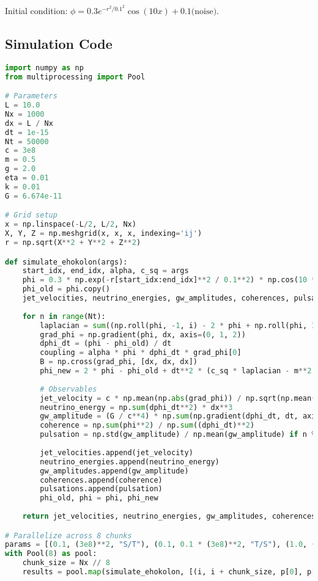 \documentclass[11pt]{article}
\begin{document}
Initial condition: \(\phi = 0.3 e^{-r^2/0.1^2} \cos(10x) + 0.1 \text{(noise)}\).

\subsection{Simulation Code}
\begin{lstlisting}[language=Python, caption={Fluxonic White Hole Simulation}, label=lst:simulation]
import numpy as np
from multiprocessing import Pool

# Parameters
L = 10.0
Nx = 1000
dx = L / Nx
dt = 1e-15
Nt = 50000
c = 3e8
m = 0.5
g = 2.0
eta = 0.01
k = 0.01
G = 6.674e-11

# Grid setup
x = np.linspace(-L/2, L/2, Nx)
X, Y, Z = np.meshgrid(x, x, x, indexing='ij')
r = np.sqrt(X**2 + Y**2 + Z**2)

def simulate_ehokolon(args):
    start_idx, end_idx, alpha, c_sq = args
    phi = 0.3 * np.exp(-r[start_idx:end_idx]**2 / 0.1**2) * np.cos(10 * X[start_idx:end_idx]) + 0.1 * np.random.rand(Nx//8, Nx, Nx)
    phi_old = phi.copy()
    jet_velocities, neutrino_energies, gw_amplitudes, coherences, pulsations = [], [], [], [], []
    
    for n in range(Nt):
        laplacian = sum((np.roll(phi, -1, i) - 2 * phi + np.roll(phi, 1, i)) / dx**2 for i in range(3))
        grad_phi = np.gradient(phi, dx, axis=(0, 1, 2))
        dphi_dt = (phi - phi_old) / dt
        coupling = alpha * phi * dphi_dt * grad_phi[0]
        B = np.cross(grad_phi, [dx, dx, dx])
        phi_new = 2 * phi - phi_old + dt**2 * (c_sq * laplacian - m**2 * phi - g * phi**3 - eta * phi**5 + 8 * np.pi * G * k * phi**2 + coupling + np.cross(B, grad_phi))
        
        # Observables
        jet_velocity = c * np.mean(np.abs(grad_phi)) / np.sqrt(np.mean(np.sum([g**2 for g in grad_phi], axis=0)) + m**2 * np.mean(phi**2))
        neutrino_energy = np.sum(dphi_dt**2) * dx**3
        gw_amplitude = (G / c**4) * np.sum(np.gradient(dphi_dt, dt, axis=0)**2) * dx**3
        coherence = np.sum(phi**2) / np.sum((dphi_dt)**2)
        pulsation = np.std(gw_amplitude) / np.mean(gw_amplitude) if n % 1000 == 0 else 0
        
        jet_velocities.append(jet_velocity)
        neutrino_energies.append(neutrino_energy)
        gw_amplitudes.append(gw_amplitude)
        coherences.append(coherence)
        pulsations.append(pulsation)
        phi_old, phi = phi, phi_new
    
    return jet_velocities, neutrino_energies, gw_amplitudes, coherences, pulsations

# Parallelize across 8 chunks
params = [(0.1, (3e8)**2, "S/T"), (0.1, 0.1 * (3e8)**2, "T/S"), (1.0, (3e8)**2, "S=T")]
with Pool(8) as pool:
    chunk_size = Nx // 8
    results = pool.map(simulate_ehokolon, [(i, i + chunk_size, p[0], p[1]) for i in range(0, Nx, chunk_size) for p in params])
\end{lstlisting}
\end{document}

